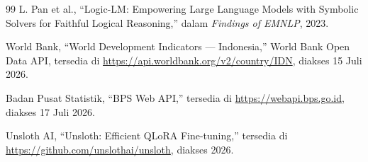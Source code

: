 \documentclass[10pt,a4paper,twocolumn]{article}
\begin{document}
\begin{thebibliography}{99}
L. Pan et al., ``Logic-LM: Empowering Large Language Models with Symbolic Solvers
for Faithful Logical Reasoning,'' dalam \textit{Findings of EMNLP}, 2023.

World Bank, ``World Development Indicators --- Indonesia,'' World Bank Open Data
API, tersedia di \url{https://api.worldbank.org/v2/country/IDN}, diakses 15 Juli
2026.

Badan Pusat Statistik, ``BPS Web API,'' tersedia di
\url{https://webapi.bps.go.id}, diakses 17 Juli 2026.

Unsloth AI, ``Unsloth: Efficient QLoRA Fine-tuning,'' tersedia di
\url{https://github.com/unslothai/unsloth}, diakses 2026.
\end{thebibliography}
\end{document}
